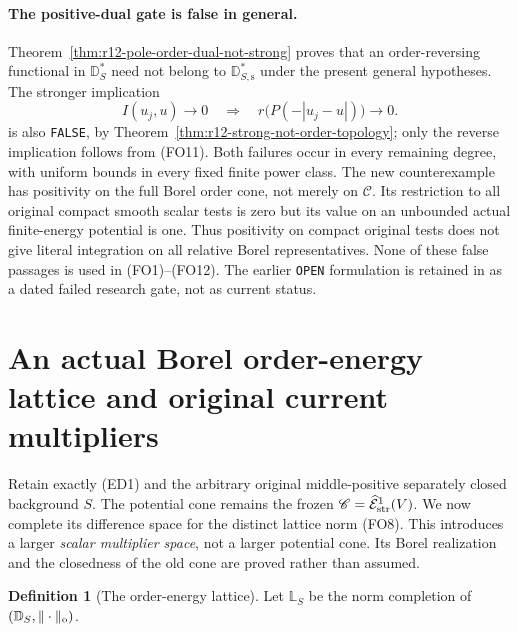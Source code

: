 \documentclass[11pt,a4paper]{article}
\numberwithin{equation}{section}
\theoremstyle{definition}
\newtheorem{definition}[theorem]{Definition}
\theoremstyle{remark}
\begin{document}
\paragraph{The positive-dual gate is false in general.}
Theorem~\ref{thm:r12-pole-order-dual-not-strong} proves
that an order-reversing functional in $\mathbb D_S^*$
need not belong to $\mathbb D_{S,\mathrm s}^*$ under
the present general hypotheses.  The stronger implication
\[
 I(u_j,u)\longrightarrow0
       \quad\Longrightarrow\quad
 r\bigl(P(-|u_j-u|)\bigr)\longrightarrow0.
 \tag{FO13}
\]
is also \texttt{FALSE}, by
Theorem~\ref{thm:r12-strong-not-order-topology}; only the
reverse implication follows from \textup{(FO11)}.
Both failures occur in every remaining degree, with
uniform bounds in every fixed finite power class.
The new counterexample has positivity on the full
Borel order cone, not merely on $\mathscr C$.
Its restriction to all original compact smooth scalar
tests is zero but its value on an unbounded actual
finite-energy potential is one.  Thus positivity on
compact original tests does not give literal integration
on all relative Borel representatives.  None of these
false passages is used in \textup{(FO1)--(FO12)}.
The earlier \texttt{OPEN} formulation is retained in
as a dated failed research gate, not as current status.



\section{An actual Borel order-energy lattice and original current multipliers}
\label{sec:r12-order-energy-lattice}

Retain exactly \textup{(ED1)} and the arbitrary original
middle-positive separately closed background $S$.  The
potential cone remains the frozen
$\mathscr C=\widehat{\mathcal E}^1_{\rm str}(V)$.
We now complete its difference space for the distinct lattice
norm \textup{(FO8)}.  This introduces a larger \emph{scalar
multiplier space}, not a larger potential cone.  Its Borel
realization and the closedness of the old cone are proved
rather than assumed.

\begin{definition}[The order-energy lattice]
\label{def:r12-order-energy-lattice}
Let $\mathbb L_S$ be the norm completion of
$(\mathbb D_S,\|\cdot\|_{\rm o})$.
\end{definition}
\end{document}
